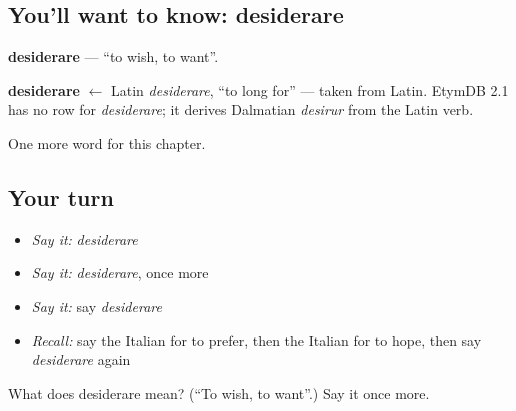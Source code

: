 \subsection*{You'll want to know: desiderare}
\textbf{desiderare} — \textquotedblleft{}to wish, to want\textquotedblright{}.

\begin{cousinweb}
\textbf{desiderare} $\leftarrow$ Latin \emph{desiderare}, \textquotedblleft{}to long for\textquotedblright{} — taken from Latin. EtymDB 2.1 has no row for \emph{desiderare}; it derives Dalmatian \emph{desirur} from the Latin verb.
\end{cousinweb}

\begin{grammarlens}[title={What you've built}]
One more word for this chapter.
\end{grammarlens}

\subsection*{Your turn}
\begin{itemize}
\raggedright
  \item \emph{Say it:} \emph{desiderare}
  \item \emph{Say it:} \emph{desiderare}, once more
  \item \emph{Say it:} say \emph{desiderare}
  \item \emph{Recall:} say the Italian for to prefer, then the Italian for to hope, then say \emph{desiderare} again
\end{itemize}

\begin{tcolorbox}[breakable,colback=teal!4,colframe=teal!35!black,title={Before you move on}]
What does desiderare mean? (\textquotedblleft{}To wish, to want\textquotedblright{}.) Say it once more.
\end{tcolorbox}
